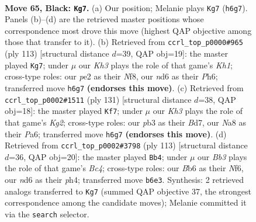 \documentclass[11pt]{article}
\begin{document}
\begin{figure}[p]\centering
\begin{subfigure}{0.46\textwidth}\centering
\resizebox{\linewidth}{!}{%
\newchessgame
\chessboard[
  setfen={n7/3n4/1b1N3k/p2p4/P7/1P2P2p/2B1P3/4K3 b - - 0 65},
  showmover=false,
  pgfstyle=straightmove, color=movearrow, markmove={h6-g7}
]}
\caption{}
\end{subfigure}\hfill
\begin{subfigure}{0.46\textwidth}\centering
\resizebox{\linewidth}{!}{%
\newchessgame
\chessboard[
  setfen={5n1k/8/3p2pp/2p5/2P2P1N/7P/6P1/6K1 b - - 0 57},
  showmover=false,
  pgfstyle=straightmove, color=movearrow, markmove={h8-g7}
]}
\caption{}
\end{subfigure}
\\[4pt]
\begin{subfigure}{0.46\textwidth}\centering
\resizebox{\linewidth}{!}{%
\newchessgame
\chessboard[
  setfen={8/3b2k1/p2P2p1/3P4/1n3P1p/1B1p1N2/5KP1/8 b - - 0 66},
  showmover=false,
  pgfstyle=straightmove, color=movearrow, markmove={g7-f7}
]}
\caption{}
\end{subfigure}\hfill
\begin{subfigure}{0.46\textwidth}\centering
\resizebox{\linewidth}{!}{%
\newchessgame
\chessboard[
  setfen={5k2/8/3p1n1p/2bP4/5P1P/1B3K2/5P2/3N4 b - - 14 57},
  showmover=false,
  pgfstyle=straightmove, color=movearrow, markmove={c5-b4}
]}
\caption{}
\end{subfigure}
\caption{\textbf{Move 65, Black: \texttt{Kg7}.} (a) Our position; Melanie plays \texttt{Kg7} (\texttt{h6g7}). Panels (b)--(d) are the retrieved master positions whose correspondence most drove this move (highest QAP objective among those that transfer to it). (b) Retrieved from \texttt{ccrl\_top\_p0000\#965} (ply 113) [structural distance $d$=39, QAP obj=19]: the master played \texttt{Kg7}; under $\mu$ our \emph{Kh3} plays the role of that game's \emph{Kh1}; cross-type roles: our \emph{p}e2 as their \emph{N}f8, our \emph{n}d6 as their \emph{P}h6; transferred move \texttt{h6g7} \textbf{(endorses this move)}. (c) Retrieved from \texttt{ccrl\_top\_p0002\#1511} (ply 131) [structural distance $d$=38, QAP obj=18]: the master played \texttt{Kf7}; under $\mu$ our \emph{Kh3} plays the role of that game's \emph{Kg2}; cross-type roles: our \emph{p}b3 as their \emph{B}d7, our \emph{N}a8 as their \emph{P}a6; transferred move \texttt{h6g7} \textbf{(endorses this move)}. (d) Retrieved from \texttt{ccrl\_top\_p0002\#3798} (ply 113) [structural distance $d$=36, QAP obj=20]: the master played \texttt{Bb4}; under $\mu$ our \emph{Bb3} plays the role of that game's \emph{Bc4}; cross-type roles: our \emph{B}b6 as their \emph{N}f6, our \emph{n}d6 as their \emph{p}h4; transferred move \texttt{b6e3}. Synthesis: 2 retrieved analogs transferred to \texttt{Kg7} (summed QAP objective 37, the strongest correspondence among the candidate moves); Melanie committed it via the \texttt{search} selector.}
\label{fig:thought-m129}
\end{figure}
\end{document}
